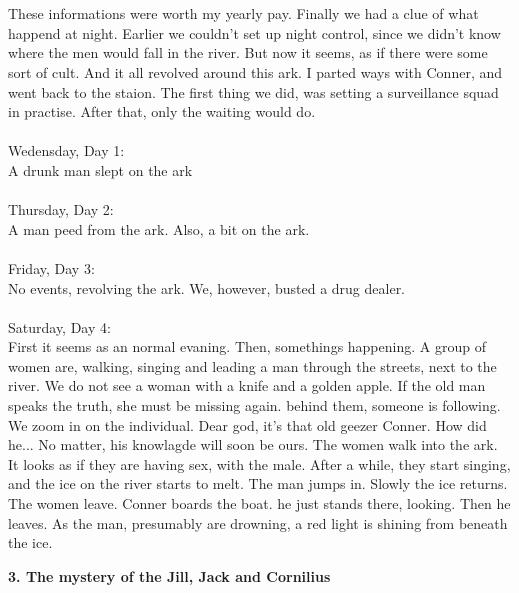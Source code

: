 \documentclass[]{article}
\begin{document}
\\ \\
These informations were worth my yearly pay. Finally we had a clue of what happend at night. Earlier we couldn't set up night control, since we didn't know where the men would fall in the river. But now it seems, as if there were some sort of cult. And it all revolved around this ark. I parted ways with Conner, and went back to the staion. The first thing we did, was setting a surveillance squad in practise. After that, only the waiting would do.
\\ \\
Wedensday, Day 1: 
\\
A drunk man slept on the ark
\\ \\
Thursday, Day 2: 
\\
A man peed from the ark. Also, a bit on the ark.
\\ \\
Friday, Day  3: 
\\
No events, revolving the ark. We, however, busted a drug dealer.
\\ \\
Saturday, Day 4:
\\
First it seems as an normal evaning. Then, somethings happening. A group of women are, walking, singing and leading a man through the streets, next to the river. We do not see a woman with a knife and a golden apple. If the old man speaks the truth, she must be missing again. behind them, someone is following. We zoom in on the individual. Dear god, it's that old geezer Conner. How did he... No matter, his knowlagde will soon be ours. The women walk into the ark. It looks as if they are having sex, with the male. After a while, they start singing, and the ice on the river starts to melt. The man jumps in. Slowly the ice returns. The women leave. Conner boards the boat. he just stands there, looking. Then he leaves. As the man, presumably are drowning, a red light is shining from beneath the ice. 

\begin{center}
	\large\textbf{3. The mystery of the Jill, Jack and Cornilius}
\end{center}
\end{document}
